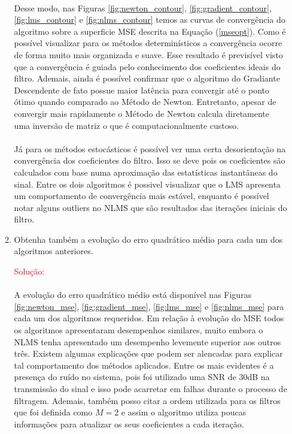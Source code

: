 \documentclass[a4paper,10pt]{article}
\begin{document}
\begin{enumerate}
\begin{enumerate}
						\paragraph{}Desse modo, nas Figuras \ref{fig:newton_contour}, \ref{fig:gradient_contour}, \ref{fig:lms_contour} e \ref{fig:nlms_contour} temos as curvas de convergência do algoritmo sobre a superficie MSE descrita na Equação (\ref{mseopt}). 
						Como é possível visualizar para os métodos determinísticos a convergência ocorre de forma muito mais organizada e suave. Esse resultado é previsível visto que a convergência é guiada 
						pelo conhecimento dos coeficientes ideais do filtro. Ademais, ainda é possível confirmar que o algoritmo do Gradiante Descendente de fato possue maior latência para convergir até o ponto 
						ótimo quando comparado ao Método de Newton. Entretanto, apesar de convergir mais rapidamente o Método de Newton calcula diretamente uma inversão de matriz o que é computacionalmente custoso.
						
						\paragraph{}Já para os métodos estocásticos é possível ver uma certa desorientação na convergência dos coeficientes do filtro. Isso se deve pois os coeficientes são calculados com base numa aproximação das 
						estatísticas instantâneas do sinal. Entre os dois algoritmos é possivel visualizar que o LMS apresenta um comportamento de convergência mais estável, enquanto é possível notar alguns outliers no NLMS que são resultados das 
						iterações iniciais do filtro.

					\item Obtenha também a evolução do erro quadrático médio para cada um dos algoritmos anteriores.
						
						\textcolor{red}{Solução:}

						\paragraph{}A evolução do erro quadrático médio está disponível nas Figuras \ref{fig:newton_mse}, \ref{fig:gradient_mse}, \ref{fig:lms_mse} e \ref{fig:nlms_mse} para cada um dos algoritmos requeridos.
						Em relação à evolução do MSE todos os algoritmos apresentaram desempenhos similares, muito embora o NLMS tenha apresentado um desempenho levemente superior aos outros três. Existem algumas explicações que podem
						ser alencadas para explicar tal comportamento dos métodos aplicados. Entre os mais evidentes é a presença do ruído no sistema, pois foi utilizado uma SNR de 30dB na transmissão do sinal e isso pode acarretar em 
						falhas durante o processo de filtragem. Ademais, também posso citar a ordem utilizada para os filtros que foi definida como $M = 2$ e assim o algoritmo utiliza poucas informações para atualizar os seus coeficientes a cada iteração. 
						

\end{enumerate}
\end{enumerate}
\end{document}
